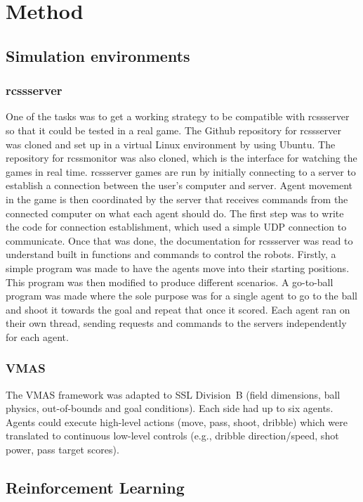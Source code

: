 \section{Method}

\subsection{Simulation environments}

\subsubsection{rcssserver}
One of the tasks was to get a working strategy to be compatible with rcssserver so that it could be tested in a real game. The Github repository for rcssserver was cloned and set up in a virtual Linux environment by using Ubuntu. The repository for rcssmonitor was also cloned, which is the interface for watching the games in real time. rcssserver games are run by initially connecting to a server to establish a connection between the user's computer and server. Agent movement in the game is then coordinated by the server that receives commands from the connected computer on what each agent should do. The first step was to write the code for connection establishment, which used a simple UDP connection to communicate. Once that was done, the documentation for rcssserver was read to understand built in functions and commands to control the robots\cite{rcssserverManual}. Firstly, a simple program was made to have the agents move into their starting positions. This program was then modified to produce different scenarios. A go-to-ball program was made where the sole purpose was for a single agent to go to the ball and shoot it towards the goal and repeat that once it scored. Each agent ran on their own thread, sending requests and commands to the servers independently for each agent.

\subsubsection{VMAS}
The VMAS framework was adapted to SSL Division~B (field dimensions, ball physics, out-of-bounds and goal conditions). Each side had up to six agents. Agents could execute high-level actions (move, pass, shoot, dribble) which were translated to continuous low-level controls (e.g., dribble direction/speed, shot power, pass target scores).

\subsection{Reinforcement Learning}
\label{subsec:rl-method}

